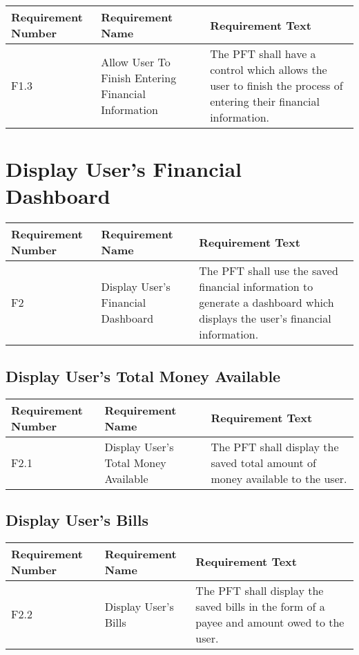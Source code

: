 \documentclass{article}
\begin{document}
\begin{longtable}{|p{2cm}|p{6cm}| p{6cm}|}
    \hline
    \textbf{Requirement Number} & \textbf{Requirement Name} & \textbf{Requirement Text}\\
    \hline
    F1.3 & Allow User To Finish Entering Financial Information & The PFT shall have a control which allows the user to finish the process of entering their financial information. \\
    \hline
\end{longtable}

\section{Display User's Financial Dashboard}

\begin{longtable}{|p{2cm}|p{6cm}| p{6cm}|}
    \hline
    \textbf{Requirement Number} & \textbf{Requirement Name} & \textbf{Requirement Text}\\
    \hline
    F2 & Display User's Financial Dashboard & The PFT shall use the saved financial information to generate a dashboard which displays the user's financial information. \\
    \hline
\end{longtable}

\subsection{Display User's Total Money Available}

\begin{longtable}{|p{2cm}|p{6cm}| p{6cm}|}
    \hline
    \textbf{Requirement Number} & \textbf{Requirement Name} & \textbf{Requirement Text}\\
    \hline
    F2.1 & Display User's Total Money Available & The PFT shall display the saved total amount of money available to the user.  \\
    \hline
\end{longtable}

\subsection{Display User's Bills}

\begin{longtable}{|p{2cm}|p{6cm}| p{6cm}|}
    \hline
    \textbf{Requirement Number} & \textbf{Requirement Name} & \textbf{Requirement Text}\\
    \hline
    F2.2 & Display User's Bills & The PFT shall display the saved bills in the form of a payee and amount owed to the user.  \\
    \hline
\end{longtable}
\end{document}
